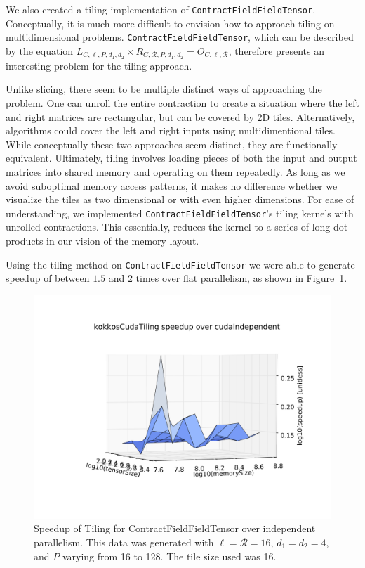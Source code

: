 We also created a tiling implementation of \texttt{ContractFieldFieldTensor}. Conceptually, it is much more difficult to envision how to approach tiling on multidimensional problems. \texttt{ContractFieldFieldTensor}, which can be described by the equation $L_{C,\ell,P,d_1,d_2} \times R_{C, \mathcal{R}, P,d_1,d_2} = O_{C,\ell, \mathcal{R}}$, therefore presents an interesting problem for the tiling approach. 

Unlike slicing, there seem to be multiple distinct ways of approaching the
problem. One can unroll the entire contraction to create a situation where
the left and right matrices are rectangular, but can be covered by 2D tiles.
Alternatively, algorithms could cover the left and right inputs using
multidimentional tiles. While conceptually these two approaches seem distinct,
they are functionally equivalent. Ultimately, tiling involves loading pieces of
both the input and output matrices into shared memory and operating on them
repeatedly. As long as we avoid suboptimal memory access patterns, it makes no
difference whether we visualize the tiles as two dimensional or with even higher
dimensions. For ease of understanding, we implemented
\texttt{ContractFieldFieldTensor}'s tiling kernels with unrolled
contractions. This essentially, reduces the kernel to a series of long dot
products in our vision of the memory layout. 

Using the tiling method on \texttt{ContractFieldFieldTensor} we were able to generate speedup of between $1.5$ and $2$ times over flat parallelism, as shown in Figure~\ref{fig:CFFTSpeedup}. 

\begin{figure}[H]
    \centering
\includegraphics[scale = .2]{ContractFieldFieldTensor}
\caption{Speedup of Tiling for ContractFieldFieldTensor over independent parallelism. This data was generated with $\ell = \mathcal{R} = 16$, $d_1 = d_2 = 4$, and $P$ varying from 16 to 128. The tile size used was 16.}
\label{fig:CFFTSpeedup}
\end{figure}

